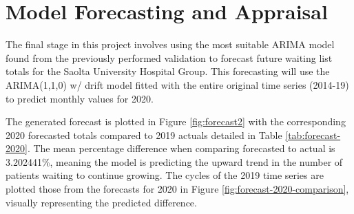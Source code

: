 \documentclass[
  12pt,
]{article}
\begin{document}
\begin{table}

\caption{\label{tab:corr-accuracy}Actual vs Predicted correlation accuracy for 2019.}
\centering
{}
\end{table}

\newpage

\hypertarget{model-forecasting-and-appraisal}{%
\section{Model Forecasting and Appraisal}\label{model-forecasting-and-appraisal}}

\label{sec:forecasting}
The final stage in this project involves using the most suitable ARIMA model found from the previously performed validation to forecast future waiting list totals for the Saolta University Hospital Group. This forecasting will use the ARIMA(1,1,0) w/ drift model fitted with the entire original time series (2014-19) to predict monthly values for 2020.

The generated forecast is plotted in Figure \ref{fig:forecast2} with the corresponding 2020 forecasted totals compared to 2019 actuals detailed in Table \ref{tab:forecast-2020}. The mean percentage difference when comparing forecasted to actual is 3.202441\%, meaning the model is predicting the upward trend in the number of patients waiting to continue growing. The cycles of the 2019 time series are plotted those from the forecasts for 2020 in Figure \ref{fig:forecast-2020-comparison}, visually representing the predicted difference.
\end{document}
